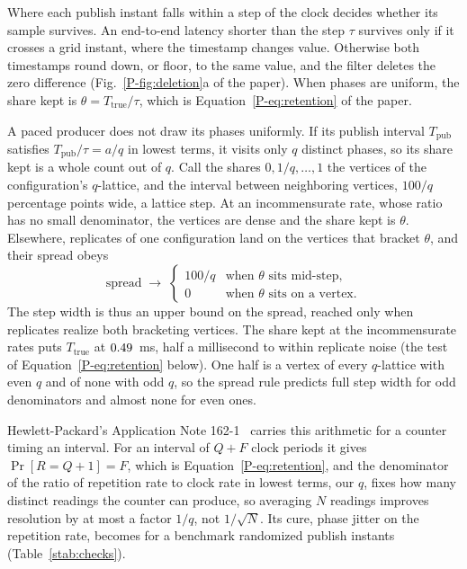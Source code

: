 \documentclass[10pt,journal,onecolumn]{IEEEtran}
\begin{document}
Where each publish instant falls within a step of the clock decides whether its sample survives. An
end-to-end latency shorter than the step $\tau$ survives only if it crosses a grid instant, where
the timestamp changes value. Otherwise both timestamps round down, or floor, to the same value, and
the filter deletes the zero difference (Fig.~\ref{P-fig:deletion}a of the
paper). When phases are
uniform, the share kept is $\theta = T_{\mathrm{true}}/\tau$, which is Equation~\ref{P-eq:retention} of
the paper.

A paced producer does not draw its phases uniformly. If its publish interval $T_{\mathrm{pub}}$
satisfies $T_{\mathrm{pub}}/\tau = a/q$ in lowest terms, it visits only $q$ distinct phases, so
its share kept is a whole count out of $q$. Call the shares $0, 1/q, \ldots, 1$ the vertices of
the configuration's $q$-lattice, and the interval between neighboring vertices, $100/q$ percentage
points wide, a lattice step. At an incommensurate rate, whose ratio has no small denominator, the
vertices are dense and the share kept is $\theta$. Elsewhere, replicates of one configuration land on
the vertices that bracket $\theta$, and their spread obeys
\begin{equation}
\label{seq:spread}
\text{spread} \;\longrightarrow\;
\begin{cases}
100/q & \text{when } \theta \text{ sits mid-step,}\\[2pt]
0 & \text{when } \theta \text{ sits on a vertex.}
\end{cases}
\end{equation}
The step width is thus an upper bound on the spread, reached only when replicates realize both
bracketing vertices. The share kept at the incommensurate rates puts $T_{\mathrm{true}}$ at
$0.49$~ms, half a millisecond to within replicate noise
(the test of Equation~\ref{P-eq:retention} below). One half is a vertex of every $q$-lattice with even $q$ and of none
with odd $q$, so the spread rule predicts full step width for odd denominators and almost none for
even ones.

Hewlett-Packard's Application Note 162-1~\cite{hp1970tia} carries this arithmetic for a counter
timing an interval. For an interval of $Q + F$ clock periods it gives $\Pr[R = Q{+}1] = F$, which is
Equation~\ref{P-eq:retention}, and the denominator of the ratio of repetition rate to clock rate in
lowest terms, our $q$, fixes how many distinct readings the counter can produce, so averaging $N$
readings improves resolution by at most a factor $1/q$, not $1/\sqrt{N}$. Its cure, phase jitter on
the repetition rate, becomes for a benchmark randomized publish instants (Table~\ref{stab:checks}).
\end{document}
